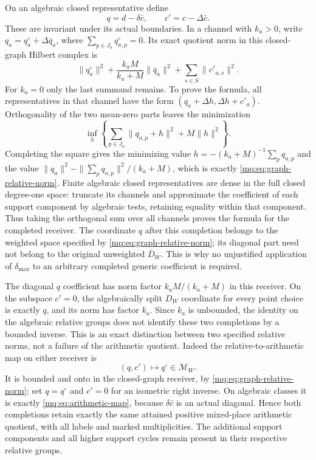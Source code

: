 \documentclass[11pt,a4paper]{article}
\theoremstyle{definition}\newtheorem{definition}[theorem]{Definition}
\begin{document}
On an algebraic closed representative define
\[
 q=d-\delta\bar c,\qquad c'=c-\Delta\bar c.
 \tag{MQ24}\label{mq:eq:relative-coordinates}
\]
These are invariant under its actual boundaries. In a channel
with $k_a>0$, write $q_a=q_a^{\circ}+\Delta\bar q_a$, where
$\sum_{p\in J_a}q_{a,p}^{\circ}=0$. Its exact quotient norm
in this closed-graph Hilbert complex is
\[
 \|q_a^{\circ}\|^2+
       \frac{k_aM}{k_a+M}\|\bar q_a\|^2+
       \sum_{s\in S}\|c'_{a,s}\|^2.
 \tag{MQ25}\label{mq:eq:graph-relative-norm}
\]
For $k_a=0$ only the last summand remains. To prove the formula,
all representatives in that channel have the form
$(q_a+\Delta h,\Delta h+c'_a)$. Orthogonality of the two
mean-zero parts leaves the minimization
\[
 \inf_h\left\{\sum_{p\in J_a}\|q_{a,p}+h\|^2
                              +M\|h\|^2\right\}.
\]
Completing the square gives the minimizing value
$h=-(k_a+M)^{-1}\sum_pq_{a,p}$ and the value
$\|q_a\|^2-\|\sum_pq_{a,p}\|^2/(k_a+M)$, which is exactly
\eqref{mq:eq:graph-relative-norm}. Finite algebraic closed
representatives are dense in the full closed degree-one space:
truncate its channels and approximate the coefficient of each
support component by algebraic tests, retaining equality within
that component. Thus taking the orthogonal sum over all channels
proves the formula for the completed receiver. The coordinate $q$
after this completion belongs to the weighted space specified by
\eqref{mq:eq:graph-relative-norm}; its diagonal part need not belong
to the original unweighted $\overline D_W$. This is why no
unjustified application of $\delta_{\max}$ to an arbitrary
completed generic coefficient is required.

The diagonal $q$ coefficient has norm factor $k_aM/(k_a+M)$
in this receiver. On the subspace $c'=0$, the algebraically
split $D_W$ coordinate for every point choice is exactly $q$,
and its norm has factor $k_a$. Since $k_a$ is unbounded, the identity on the
algebraic relative groups does not identify these two completions
by a bounded inverse. This is an exact distinction between two
specified relative norms, not a failure of the arithmetic quotient.
Indeed the relative-to-arithmetic map on either receiver is
\[
 (q,c')\longmapsto q^{\circ}\in\mathscr M_W.
 \tag{MQ26}\label{mq:eq:completed-arithmetic-image}
\]
It is bounded and onto in the closed-graph receiver, by
\eqref{mq:eq:graph-relative-norm}; set $q=q^{\circ}$ and $c'=0$
for an isometric right inverse. On algebraic classes it is exactly
\eqref{mq:eq:arithmetic-map}, because $\delta\bar c$ is an actual
diagonal. Hence both completions retain exactly the same attained
positive mixed-place arithmetic quotient, with all labels and
marked multiplicities. The additional support components and
all higher support cycles remain present in their respective
relative groups.
\end{document}
